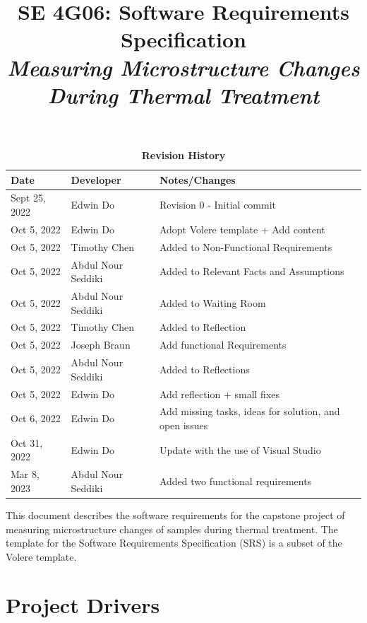 \documentclass[12pt, titlepage]{article}
\title{SE 4G06: Software Requirements Specification\\\textit{Measuring Microstructure Changes During Thermal Treatment }}
\author{\authname}
\date{}
\begin{document}
\maketitle

\tableofcontents
\listoftables
\listoffigures

\begin{table}[H]
\caption{\bf Revision History}
\begin{tabularx}{\textwidth}{p{2.5cm}p{2.5cm}X}
\toprule {\bf Date} & {\bf Developer} & {\bf Notes/Changes}\\
\midrule
Sept 25, 2022 & Edwin Do & Revision 0 - Initial commit\\
Oct 5, 2022 & Edwin Do & Adopt Volere template + Add content \\
Oct 5, 2022 & Timothy Chen & Added to Non-Functional Requirements\\
Oct 5, 2022 & Abdul Nour Seddiki & Added to Relevant Facts and Assumptions\\
Oct 5, 2022 & Abdul Nour Seddiki & Added to Waiting Room\\
Oct 5, 2022 & Timothy Chen & Added to Reflection\\
Oct 5, 2022 & Joseph Braun & Add functional Requirements \\ 
Oct 5, 2022 & Abdul Nour Seddiki & Added to Reflections\\
Oct 5, 2022 & Edwin Do & Add reflection + small fixes \\
Oct 6, 2022 & Edwin Do & Add missing tasks, ideas for solution, and open issues \\
Oct 31, 2022 & Edwin Do & Update with the use of Visual Studio\\
Mar 8, 2023 & Abdul Nour Seddiki & Added two functional requirements\\
\bottomrule
\end{tabularx}
\end{table}

\newpage


\noindent This document describes the software requirements for the capstone project of measuring microstructure changes of samples during thermal treatment. The template for the Software Requirements Specification (SRS) is a subset of the Volere
template.


\section{Project Drivers}
\end{document}
